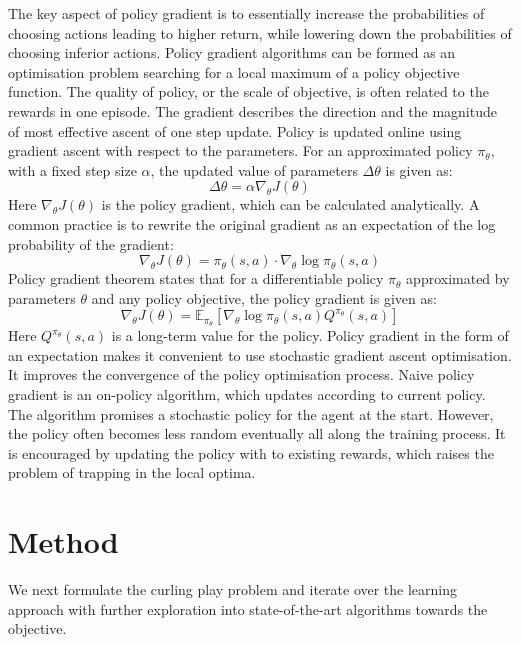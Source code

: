 \documentclass[oneside,11pt,a4paper]{article}
\begin{document}
\noindent
The key aspect of policy gradient is to essentially increase the probabilities of choosing actions leading to higher return, while lowering down the probabilities of choosing inferior actions. Policy gradient algorithms can be formed as an optimisation problem searching for a local maximum of a policy objective function. The quality of policy, or the scale of objective, is often related to the rewards in one episode. The gradient describes the direction and the magnitude of most effective ascent of one step update. Policy is updated online using gradient ascent with respect to the parameters. For an approximated policy $\pi_\theta$, with a fixed step size $\alpha$, the updated value of parameters $\Delta \theta$ is given as:
$$
\Delta\theta=\alpha\nabla_\theta J(\theta)
$$
Here $\nabla_\theta J(\theta)$ is the policy gradient, which can be calculated analytically. A common practice is to rewrite the original gradient as an expectation of the log probability of the gradient:
$$
\nabla_\theta J(\theta) = \pi_\theta(s,a)\cdot\nabla_\theta \log\pi_\theta(s,a)
$$
Policy gradient theorem states that for a differentiable policy $\pi_\theta$ approximated by parameters $\theta$ and any policy objective, the policy gradient is given as:
$$
\nabla_\theta J(\theta) = \mathbb E_{\pi_\theta}[\nabla_\theta\log\pi_\theta(s,a)Q^{\pi_\theta}(s,a)]
$$
Here $Q^{\pi_\theta}(s,a)$ is a long-term value for the policy. Policy gradient in the form of an expectation makes it convenient to use stochastic gradient ascent optimisation. It improves the convergence of the policy optimisation process. Naive policy gradient is an on-policy algorithm, which updates according to current policy. The algorithm promises a stochastic policy for the agent at the start. However, the policy often becomes less random eventually all along the training process. It is encouraged by updating the policy with to existing rewards, which raises the problem of trapping in the local optima.

\newpage
\section{Method}


We next formulate the curling play problem and iterate over the learning approach with further exploration into state-of-the-art algorithms towards the objective.
\end{document}
